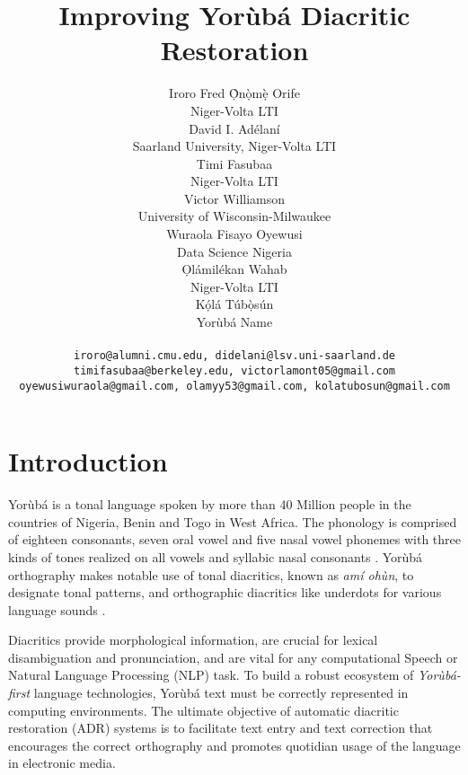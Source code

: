 \documentclass{article} %
\title{Improving Yor{\`u}b{\'a} Diacritic Restoration}
\author{Iroro Fred \d{\`O}n\d{\`o}m\d{\`e} Orife \\
Niger-Volta LTI\\
\And
David I. Ad{\'e}lan{\'i} \\
Saarland University, Niger-Volta LTI \\
\And
Timi Fasubaa \\
Niger-Volta LTI \\
\And
Victor Williamson \\
University of Wisconsin-Milwaukee \\
\And
Wuraola Fisayo Oyewusi\\
Data Science Nigeria \\
\And
\d{O}l{\'a}mil{\'e}kan Wahab \\
Niger-Volta LTI \\
\And
K\d{\'{o}}l\'{a} T\'{u}b\d{\`{o}}s\'{u}n \\
Yor{\`u}b{\'a} Name \\
\\
\texttt{\footnotesize iroro@alumni.cmu.edu, didelani@lsv.uni-saarland.de} \vspace*{-.2em} \\
\texttt{\footnotesize timifasubaa@berkeley.edu,  victorlamont05@gmail.com} \vspace*{-.2em} \\
\texttt{\footnotesize oyewusiwuraola@gmail.com, olamyy53@gmail.com, kolatubosun@gmail.com}
}
\begin{document}
\maketitle


\section{Introduction}\label{sec:introduction}

Yor{\`u}b{\'a} is a tonal language spoken by more than 40 Million people in the countries of Nigeria, Benin and Togo in West Africa. The phonology is comprised of eighteen consonants, seven oral vowel and five nasal vowel phonemes with three kinds of tones realized on all vowels and syllabic nasal consonants \citep{akinlabi2004sound}. Yor{\`u}b{\'a} orthography makes notable use of tonal diacritics, known as \emph{am{\'i} oh{\`u}n}, to designate tonal patterns, and orthographic diacritics like underdots for various language sounds \citep{adegbola2012quantifying, wells2000orthographic}.

Diacritics provide morphological information, are crucial for lexical disambiguation and pronunciation, and are vital for any computational Speech or Natural Language Processing (NLP) task. To build a robust ecosystem of \emph{Yor{\`u}b{\'a}-first} language technologies, Yor{\`u}b{\'a} text must be correctly represented in computing environments. The ultimate objective of automatic diacritic restoration (ADR) systems is to facilitate text entry and text correction that encourages the correct orthography and promotes quotidian usage of the language in electronic media.
\end{document}
